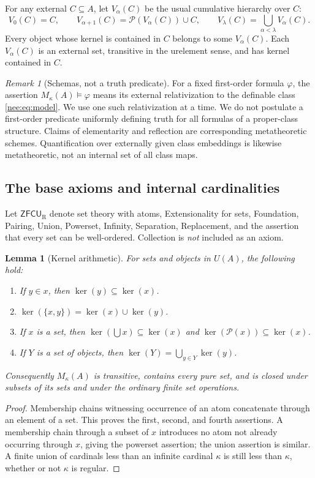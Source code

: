 \documentclass[11pt,letterpaper]{article}
\numberwithin{equation}{section}
\theoremstyle{plain}
\newtheorem{lemma}[lemma]{Lemma}
\theoremstyle{definition}
\theoremstyle{remark}
\newtheorem{remark}[remark]{Remark}
\newcommand{\ZFCUR}{\mathsf{ZFCU}_{\mathrm R}}
\newcommand{\kerat}{\operatorname{ker}}
\begin{document}
For any external $C\subseteq A$, let $V_\alpha(C)$ be the usual cumulative hierarchy over $C$:
\[
V_0(C)=C,\qquad V_{\alpha+1}(C)=\mathcal P(V_\alpha(C))\cup C,
\qquad V_\lambda(C)=\bigcup_{\alpha<\lambda}V_\alpha(C).
\]
Every object whose kernel is contained in $C$ belongs to some $V_\alpha(C)$. Each $V_\alpha(C)$ is an external set, transitive in the urelement sense, and has kernel contained in $C$.

\begin{remark}[Schemas, not a truth predicate]\label{nee:rem:schema}
For a fixed first-order formula $\varphi$, the assertion $M_\kappa(A)\models\varphi$ means its external relativization to the definable class \eqref{nee:eq:model}. We use one such relativization at a time. We do not postulate a first-order predicate uniformly defining truth for all formulas of a proper-class structure. Claims of elementarity and reflection are corresponding metatheoretic schemes. Quantification over externally given class embeddings is likewise metatheoretic, not an internal set of all class maps.
\end{remark}

\subsection{The base axioms and internal cardinalities}
Let $\ZFCUR$ denote set theory with atoms, Extensionality for sets, Foundation, Pairing, Union, Powerset, Infinity, Separation, Replacement, and the assertion that every set can be well-ordered. Collection is \emph{not} included as an axiom.

\begin{lemma}[Kernel arithmetic]\label{nee:lem:kernel}
For sets and objects in $U(A)$, the following hold:
\begin{enumerate}
\item If $y\in x$, then $\kerat(y)\subseteq\kerat(x)$.
\item $\kerat(\{x,y\})=\kerat(x)\cup\kerat(y)$.
\item If $x$ is a set, then $\kerat(\bigcup x)\subseteq\kerat(x)$ and $\kerat(\mathcal P(x))\subseteq\kerat(x)$.
\item If $Y$ is a set of objects, then $\kerat(Y)=\bigcup_{y\in Y}\kerat(y)$.
\end{enumerate}
Consequently $M_\kappa(A)$ is transitive, contains every pure set, and is closed under subsets of its sets and under the ordinary finite set operations.
\end{lemma}
\begin{proof}
Membership chains witnessing occurrence of an atom concatenate through an element of a set. This proves the first, second, and fourth assertions. A membership chain through a subset of $x$ introduces no atom not already occurring through $x$, giving the powerset assertion; the union assertion is similar. A finite union of cardinals less than an infinite cardinal $\kappa$ is still less than $\kappa$, whether or not $\kappa$ is regular.
\end{proof}
\end{document}
